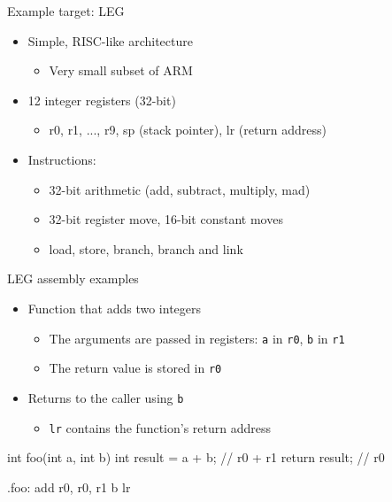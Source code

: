 \begin{frame}{Example target: LEG}

\begin{itemize}
    \item Simple, RISC-like architecture
    \begin{itemize}
        \item Very small subset of ARM
    \end{itemize}
    \item 12 integer registers (32-bit)
    \begin{itemize}
        \item r0, r1, ..., r9, sp (stack pointer), lr (return address)
    \end{itemize}
    \item Instructions:
    \begin{itemize}
        \item 32-bit arithmetic (add, subtract, multiply, mad)
        \item 32-bit register move, 16-bit constant moves
        \item load, store, branch, branch and link
    \end{itemize}
\end{itemize}

\end{frame}


\begin{frame}[fragile]{LEG assembly examples}

\begin{itemize}
    \item Function that adds two integers
    \begin{itemize}
        \item The arguments are passed in registers: \texttt{a} in \texttt{r0}, \texttt{b} in \texttt{r1}
        \item The return value is stored in \texttt{r0}
    \end{itemize}
    \item Returns to the caller using \texttt{b}
    \begin{itemize}
        \item \texttt{lr} contains the function's return address
    \end{itemize}
\end{itemize}

\begin{codebox}
int foo(int a, int b) {
    int result = a + b;   // r0 + r1
    return result;        // r0
}
\end{codebox}

\begin{codebox}
.foo:
    add r0, r0, r1
    b lr
\end{codebox}

\end{frame}

